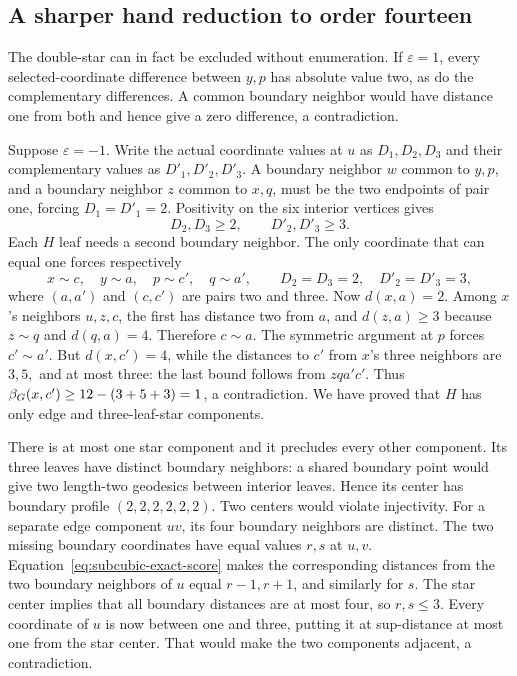 \subsection{A sharper hand reduction to order fourteen}
The double-star can in fact be excluded without enumeration. If
$\varepsilon=1$, every selected-coordinate difference between $y,p$ has
absolute value two, as do the complementary differences. A common boundary
neighbor would have distance one from both and hence give a zero difference,
a contradiction.

Suppose $\varepsilon=-1$. Write the actual coordinate values at $u$ as
$D_1,D_2,D_3$ and their complementary values as $D'_1,D'_2,D'_3$.
A boundary neighbor $w$ common to $y,p$, and a boundary neighbor $z$ common
to $x,q$, must be the two endpoints of pair one, forcing
$D_1=D'_1=2$. Positivity on the six interior vertices gives
\[
 D_2,D_3\ge2,\qquad D'_2,D'_3\ge3.
\]
Each $H$ leaf needs a second boundary neighbor. The only coordinate
that can equal one forces respectively
\[
 x\sim c,\quad y\sim a,\quad p\sim c',\quad q\sim a',
 \qquad D_2=D_3=2,\quad D'_2=D'_3=3,
\]
where $(a,a')$ and $(c,c')$ are pairs two and three.
Now $d(x,a)=2$. Among $x$'s neighbors $u,z,c$, the first has distance two
from $a$, and $d(z,a)\ge3$ because $z\sim q$ and $d(q,a)=4$.
Therefore $c\sim a$. The symmetric argument at $p$ forces $c'\sim a'$.
But $d(x,c')=4$, while the distances to $c'$ from $x$'s three neighbors
are $3,5,$ and at most three: the last bound follows from $zqa'c'$.
Thus $\beta_G(x,c')\ge12-(3+5+3)=1$, a contradiction.
We have proved that $H$ has only edge and three-leaf-star components.

There is at most one star component and it precludes every other component.
Its three leaves have distinct boundary neighbors: a shared boundary point
would give two length-two geodesics between interior leaves. Hence its center
has boundary profile $(2,2,2,2,2,2)$. Two centers would violate injectivity.
For a separate edge component $uv$, its four boundary neighbors are distinct.
The two missing boundary coordinates have equal values $r,s$ at $u,v$.
Equation~\eqref{eq:subcubic-exact-score} makes the corresponding distances
from the two boundary neighbors of $u$ equal $r-1,r+1$, and similarly for
$s$. The star center implies that all boundary distances are at most four,
so $r,s\le3$. Every coordinate of $u$ is now between one and three, putting
it at sup-distance at most one from the star center. That would make the
two components adjacent, a contradiction.


